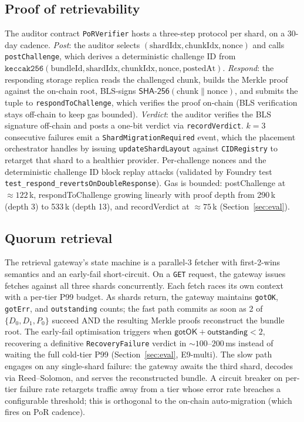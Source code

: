 \subsection{Proof of retrievability}
\label{sec:method:por}

The auditor contract \texttt{PoRVerifier} hosts a three-step protocol per shard, on a 30-day cadence. \emph{Post}: the auditor selects $(\text{shardIdx}, \text{chunkIdx}, \text{nonce})$ and calls \texttt{postChallenge}, which derives a deterministic challenge ID from $\texttt{keccak256}(\text{bundleId}, \text{shardIdx}, \text{chunkIdx}, \text{nonce}, \text{postedAt})$. \emph{Respond}: the responding storage replica reads the challenged chunk, builds the Merkle proof against the on-chain root, BLS-signs $\textsf{SHA-256}(\text{chunk} \mathbin{\|} \text{nonce})$, and submits the tuple to \texttt{respondToChallenge}, which verifies the proof on-chain (BLS verification stays off-chain to keep gas bounded). \emph{Verdict}: the auditor verifies the BLS signature off-chain and posts a one-bit verdict via \texttt{recordVerdict}. $k = 3$ consecutive failures emit a \texttt{ShardMigrationRequired} event, which the placement orchestrator handles by issuing \texttt{updateShardLayout} against \texttt{CIDRegistry} to retarget that shard to a healthier provider. Per-challenge nonces and the deterministic challenge ID block replay attacks (validated by Foundry test \texttt{test\_respond\_revertsOnDoubleResponse}). Gas is bounded: \textsf{postChallenge} at $\approx 122$\,k, \textsf{respondToChallenge} growing linearly with proof depth from 290\,k (depth 3) to 533\,k (depth 13), and \textsf{recordVerdict} at $\approx 75$\,k (Section~\ref{sec:eval}).

\subsection{Quorum retrieval}
\label{sec:method:retrieval}

The retrieval gateway's state machine is a parallel-3 fetcher with first-2-wins semantics and an early-fail short-circuit. On a \texttt{GET} request, the gateway issues fetches against all three shards concurrently. Each fetch races its own context with a per-tier P99 budget. As shards return, the gateway maintains \texttt{gotOK}, \texttt{gotErr}, and \texttt{outstanding} counts; the fast path commits as soon as 2 of $\{D_0, D_1, P_0\}$ succeed AND the resulting Merkle proofs reconstruct the bundle root. The early-fail optimisation triggers when $\textsf{gotOK} + \textsf{outstanding} < 2$, recovering a definitive \texttt{RecoveryFailure} verdict in $\sim 100$--$200$\,ms instead of waiting the full cold-tier P99 (Section~\ref{sec:eval}, E9-multi). The slow path engages on any single-shard failure: the gateway awaits the third shard, decodes via Reed--Solomon, and serves the reconstructed bundle. A circuit breaker on per-tier failure rate retargets traffic away from a tier whose error rate breaches a configurable threshold; this is orthogonal to the on-chain auto-migration (which fires on PoR cadence).

